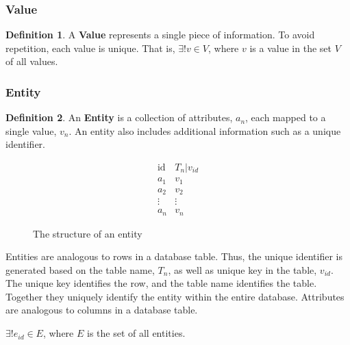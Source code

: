 \documentclass[12pt,letterpaper,oneside,notitlepage]{report}
\theoremstyle{definition}
\newtheorem{defn}{Definition}
\begin{document}
        \subsubsection{Value}
          \begin{defn}
            A \textbf{Value} represents a single piece of information.  To avoid repetition, each value is unique.  That is, $\exists! v \in V$, where $v$ is a value in the set $V$ of all values.
          \end{defn}

        \subsubsection{Entity}
          \begin{defn}
            An \textbf{Entity} is a collection of attributes, $a_n$, each mapped to a single value, $v_n$.  An entity also includes additional information such as a unique identifier.

            \begin{figure}[!ht]
              \centering
              \[
                \begin{array}{ll}
                  \mathrm{id} & T_n|v_{id} \\
                  a_1 & v_1 \\
                  a_2 & v_2 \\
                  \vdots & \vdots \\
                  a_n & v_n
                \end{array}
              \]
              \caption{The structure of an entity}
              \label{fig:entity-rep}
            \end{figure}

            Entities are analogous to rows in a database table.  Thus, the unique identifier is generated based on the table name, $T_n$, as well as unique key in the table, $v_{id}$.  The unique key identifies the row, and the table name identifies the table.  Together they uniquely identify the entity within the entire database.  Attributes are analogous to columns in a database table.

            $\exists! e_{id} \in E$, where $E$ is the set of all entities.
          \end{defn}
\end{document}
